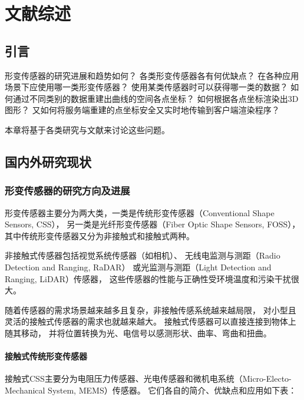 \clearpage
\chapter{文献综述}
\section{引言} 
形变传感器的研究进展和趋势如何？
各类形变传感器各有何优缺点？
在各种应用场景下应使用哪一类形变传感器？
使用某类传感器时可以获得哪一类的数据？
如何通过不同类别的数据重建出曲线的空间各点坐标？
如何根据各点坐标渲染出3D图形？
又如何将服务端重建的点坐标安全又实时地传输到客户端渲染程序？

本章将基于各类研究与文献来讨论这些问题。

\section{国内外研究现状}
\subsection{形变传感器的研究方向及进展}

形变传感器主要分为两大类，一类是传统形变传感器（Conventional Shape Sensors, CSS），
另一类是光纤形变传感器（Fiber Optic Shape Sensors, FOSS）， 
其中传统形变传感器又分为非接触式和接触式两种。

非接触式传感器包括视觉系统传感器（如相机）、
无线电监测与测距（Radio Detection and Ranging, RaDAR）
或光监测与测距（Light Detection and Ranging, LiDAR）传感器，
这些传感器的性能与正确性受环境温度和污染干扰很大。

随着传感器的需求场景越来越多且复杂，非接触传感系统越来越局限，
对小型且灵活的接触式传感器的需求也就越来越大。
接触式传感器可以直接连接到物体上随其移动，
并将位置转换为光、电信号以感测形状、曲率、弯曲和扭曲。

\subsubsection{接触式传统形变传感器}

接触式CSS主要分为电阻压力传感器、光电传感器和微机电系统（Micro-Electo-Mechanical System, MEMS）传感器。
它们各自的简介、优缺点和应用如下表\cite{recent-dev-in-foss}：

